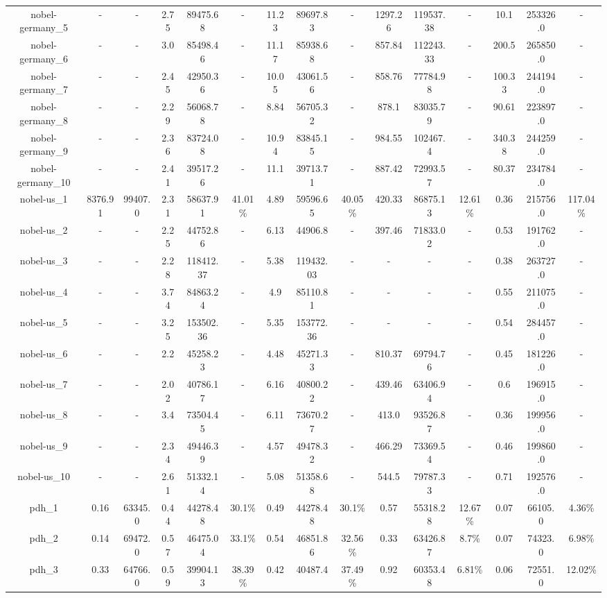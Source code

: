 \documentclass[main.tex]{subfiles}
\begin{document}
\begin{landscape}
\begin{table}[h]
{\begin{tabular}{c|cc|ccc|ccc|ccc|ccc}
	nobel-germany\_5 &- &- &2.75 &89475.68 &- &11.23 &89697.83 &- &1297.26 &119537.38 &- &10.1 &253326.0 &-\\
	nobel-germany\_6 &- &- &3.0 &85498.46 &- &11.17 &85938.68 &- &857.84 &112243.33 &- &200.5 &265850.0 &-\\
	nobel-germany\_7 &- &- &2.45 &42950.36 &- &10.05 &43061.56 &- &858.76 &77784.98 &- &100.33 &244194.0 &-\\
	nobel-germany\_8 &- &- &2.29 &56068.78 &- &8.84 &56705.32 &- &878.1 &83035.79 &- &90.61 &223897.0 &-\\
	nobel-germany\_9 &- &- &2.36 &83724.08 &- &10.94 &83845.15 &- &984.55 &102467.4 &- &340.38 &244259.0 &-\\
	nobel-germany\_10 &- &- &2.41 &39517.26 &- &11.1 &39713.71 &- &887.42 &72993.57 &- &80.37 &234784.0 &-\\
	nobel-us\_1 &8376.91 &99407.0 &2.31 &58637.91 &41.01\% &4.89 &59596.65 &40.05\% &420.33 &86875.13 &12.61\% &0.36 &215756.0 &117.04\%\\
	nobel-us\_2 &- &- &2.25 &44752.86 &- &6.13 &44906.8 &- &397.46 &71833.02 &- &0.53 &191762.0 &-\\
	nobel-us\_3 &- &- &2.28 &118412.37 &- &5.38 &119432.03 &- &- &- &- &0.38 &263727.0 &-\\
	nobel-us\_4 &- &- &3.74 &84863.24 &- &4.9 &85110.81 &- &- &- &- &0.55 &211075.0 &-\\
	nobel-us\_5 &- &- &3.25 &153502.36 &- &5.35 &153772.36 &- &- &- &- &0.54 &284457.0 &-\\
	nobel-us\_6 &- &- &2.2 &45258.23 &- &4.48 &45271.33 &- &810.37 &69794.76 &- &0.45 &181226.0 &-\\
	nobel-us\_7 &- &- &2.02 &40786.17 &- &6.16 &40800.22 &- &439.46 &63406.94 &- &0.6 &196915.0 &-\\
	nobel-us\_8 &- &- &3.4 &73504.45 &- &6.11 &73670.27 &- &413.0 &93526.87 &- &0.36 &199956.0 &-\\
	nobel-us\_9 &- &- &2.34 &49446.39 &- &4.57 &49478.32 &- &466.29 &73369.54 &- &0.46 &199860.0 &-\\
	nobel-us\_10 &- &- &2.61 &51332.14 &- &5.08 &51358.68 &- &544.5 &79787.33 &- &0.71 &192576.0 &-\\
	pdh\_1 &0.16 &63345.0 &0.44 &44278.48 &30.1\% &0.49 &44278.48 &30.1\% &0.57 &55318.28 &12.67\% &0.07 &66105.0 &4.36\%\\
	pdh\_2 &0.14 &69472.0 &0.57 &46475.04 &33.1\% &0.54 &46851.86 &32.56\% &0.33 &63426.87 &8.7\% &0.07 &74323.0 &6.98\%\\
	pdh\_3 &0.33 &64766.0 &0.59 &39904.13 &38.39\% &0.42 &40487.4 &37.49\% &0.92 &60353.48 &6.81\% &0.06 &72551.0 &12.02\%\\

\end{tabular}}
\end{table}
\end{landscape}
\end{document}

